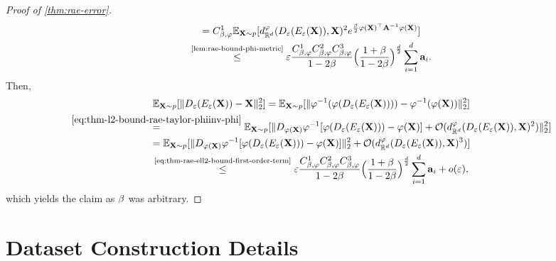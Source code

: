 \begin{proof}[Proof of \ref{thm:rae-error}]
\begin{multline}
        = C^1_{\beta,\varphi} \mathbb{E}_{\mathbf{X} \sim p}[ d_{\mathbb{R}^{d}}^\varphi (D_\varepsilon(E_\varepsilon(\mathbf{X})), \mathbf{X})^2 e^{\frac{\beta}{2} \varphi(\mathbf{X})^\top \mathbf{A}^{-1} \varphi(\mathbf{X})}]\\
        \overset{\text{\ref{lem:rae-bound-phi-metric}}}{\leq} \varepsilon  \frac{C^1_{\beta,\varphi} C^2_{\beta,\varphi} C^3_{\beta,\varphi}}{1 - 2\beta} \Bigl(\frac{1 + \beta}{1 - 2\beta} \Bigr)^{\frac{d}{2}}  \sum_{i=1}^{d} \mathbf{a}_{i}.
        \label{eq:thm-rae-ell2-bound-first-order-term}
    \end{multline}
    Then, 
    \begin{multline}
        \mathbb{E}_{\mathbf{X} \sim p}[\| D_\varepsilon(E_\varepsilon(\mathbf{X}))-  \mathbf{X}\|_2^2] = \mathbb{E}_{\mathbf{X} \sim p}[\| \varphi^{-1}(\varphi( D_\varepsilon(E_\varepsilon(\mathbf{X})) ))-  \varphi^{-1}(\varphi(\mathbf{X}))\|_2^2] \\
        \overset{\ref{eq:thm-l2-bound-rae-taylor-phiinv-phi}}{=} \mathbb{E}_{\mathbf{X} \sim p}[\|D_{\varphi(\mathbf{X})} \varphi^{-1} [\varphi(D_\varepsilon(E_\varepsilon(\mathbf{X}))) - \varphi(\mathbf{X})]  + \mathcal{O}(d_{\mathbb{R}^{d}}^\varphi(D_\varepsilon(E_\varepsilon(\mathbf{X})),\mathbf{X})^2)\|_2^2] \\
        = \mathbb{E}_{\mathbf{X} \sim p}[\|D_{\varphi(\mathbf{X})} \varphi^{-1} [\varphi(D_\varepsilon(E_\varepsilon(\mathbf{X}))) - \varphi(\mathbf{X})]\|_2^2 + \mathcal{O}(d_{\mathbb{R}^{d}}^\varphi(D_\varepsilon(E_\varepsilon(\mathbf{X})),\mathbf{X})^3)]\\
        \overset{\text{\ref{eq:thm-rae-ell2-bound-first-order-term}}}{\leq} \varepsilon  \frac{C^1_{\beta,\varphi} C^2_{\beta,\varphi} C^3_{\beta,\varphi}}{1 - 2\beta} \Bigl(\frac{1 + \beta}{1 - 2\beta} \Bigr)^{\frac{d}{2}}  \sum_{i=1}^{d} \mathbf{a}_{i} + o(\varepsilon),
    \end{multline}
    which yields the claim as $\beta$ was arbitrary. 
\end{proof}

\section{Dataset Construction Details}
\label{app:dataset_construction}

